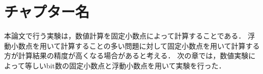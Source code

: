 \chapter {チャプター名}
\label{chap:提案手法}
\begin{comment}
    ストーリー：
    固定小数点演算は浮動小数点演算よりも計算時間が速いとされている．
    しかし，浮動小数点に比べて精度が低くなる恐れがある．
    本論文では，固定小数点と浮動小数点での数値計算の結果を比べ，固定小数点での演算も浮動小数点と同程度の精度で計算できることを示した．
    実験結果より固定小数点演算で浮動小数点より高速で，浮動小数点と同程度の計算を実現できるのではないかと考える．
\end{comment}
本論文で行う実験は，数値計算を固定小数点によって計算することである．
浮動小数点を用いて計算することの多い問題に対して固定小数点を用いて計算する方が計算結果の精度が高くなる場合があると考える．
次の章では，数値実験によって等しいbit数の固定小数点と浮動小数点を用いて実験を行った．


